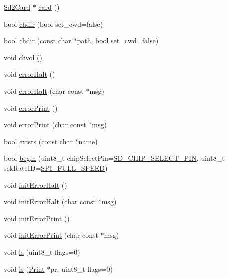 \begin{DoxyCompactItemize}
\item 
\hyperlink{class_sd2_card}{Sd2\-Card} $\ast$ \hyperlink{class_sd_fat_aef4142d94f7839ca995258104689cb49}{card} ()
\item 
bool \hyperlink{class_sd_fat_ae3d2d2603557ec715424ce49a492b88d}{chdir} (bool set\-\_\-cwd=false)
\item 
bool \hyperlink{class_sd_fat_ab1cce194302632fea44f4fc19568243c}{chdir} (const char $\ast$path, bool set\-\_\-cwd=false)
\item 
void \hyperlink{class_sd_fat_a6938c3c1aa123a347a141e8c0ce7f6cd}{chvol} ()
\item 
void \hyperlink{class_sd_fat_a4b6e75ef716adc1bbcb507d44e3526e3}{error\-Halt} ()
\item 
void \hyperlink{class_sd_fat_a17d9c22d2f6d0e09e7b6f17984a894a8}{error\-Halt} (char const $\ast$msg)
\item 
void \hyperlink{class_sd_fat_a6b4142fb31ccc0934cef399449884044}{error\-Print} ()
\item 
void \hyperlink{class_sd_fat_a47e82cd1147e73941e283845fa3cd357}{error\-Print} (char const $\ast$msg)
\item 
bool \hyperlink{class_sd_fat_ace1cb5fa7dac7c504114b2b24ec144d2}{exists} (const char $\ast$\hyperlink{_sd_fat_structs_8h_a30308c9b983377042fd2cc8900454fb1}{name})
\item 
bool \hyperlink{class_sd_fat_abb957a84fd9bc395b887952f0e962f7f}{begin} (uint8\-\_\-t chip\-Select\-Pin=\hyperlink{_sd2_card_8h_ae6b17538c14ba6c91ccb513db2c4c29c}{S\-D\-\_\-\-C\-H\-I\-P\-\_\-\-S\-E\-L\-E\-C\-T\-\_\-\-P\-I\-N}, uint8\-\_\-t sck\-Rate\-I\-D=\hyperlink{_sd2_card_8h_a6c091c07d1eb82a94b1c5738f720264b}{S\-P\-I\-\_\-\-F\-U\-L\-L\-\_\-\-S\-P\-E\-E\-D})
\item 
void \hyperlink{class_sd_fat_a9eac8973a61936ee8757c31eb23b5f93}{init\-Error\-Halt} ()
\item 
void \hyperlink{class_sd_fat_abced6792e61807da3f4f8dbf18384d08}{init\-Error\-Halt} (char const $\ast$msg)
\item 
void \hyperlink{class_sd_fat_a72896d51dedf0ed435e1e83914702a37}{init\-Error\-Print} ()
\item 
void \hyperlink{class_sd_fat_ad4d6d875ad6bd6e0f88e24d2b7e8761a}{init\-Error\-Print} (char const $\ast$msg)
\item 
void \hyperlink{class_sd_fat_afaff0496e55019ed50d950230dd9c4f0}{ls} (uint8\-\_\-t flags=0)
\item 
void \hyperlink{class_sd_fat_a02c37b626448ff79d9e99479afacc587}{ls} (\hyperlink{class_print}{Print} $\ast$pr, uint8\-\_\-t flags=0)

\end{DoxyCompactItemize}
